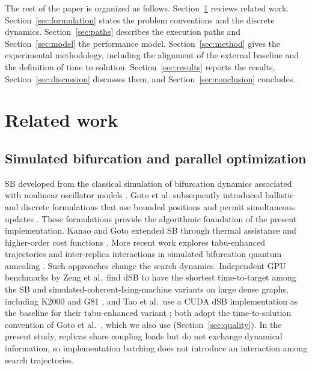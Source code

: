 \documentclass[11pt,a4paper]{article}
\begin{document}
The rest of the paper is organized as follows. Section~\ref{sec:related} reviews related work. Section~\ref{sec:formulation} states the problem conventions and the discrete dynamics. Section~\ref{sec:paths} describes the execution paths and Section~\ref{sec:model} the performance model. Section~\ref{sec:method} gives the experimental methodology, including the alignment of the external baseline and the definition of time to solution. Section~\ref{sec:results} reports the results, Section~\ref{sec:discussion} discusses them, and Section~\ref{sec:conclusion} concludes.

\section{Related work}\label{sec:related}
\subsection{Simulated bifurcation and parallel optimization}
SB developed from the classical simulation of bifurcation dynamics associated with nonlinear oscillator models \cite{goto2016,goto2019}. Goto et al. subsequently introduced ballistic and discrete formulations that use bounded positions and permit simultaneous updates \cite{goto2021}. These formulations provide the algorithmic foundation of the present implementation. Kanao and Goto extended SB through thermal assistance \cite{kanao2022} and higher-order cost functions \cite{kanao2023}. More recent work explores tabu-enhanced trajectories \cite{tabu2026} and inter-replica interactions in simulated bifurcation quantum annealing \cite{sbqa2026}. Such approaches change the search dynamics. Independent GPU benchmarks by Zeng et al.\ find dSB to have the shortest time-to-target among the SB and simulated-coherent-Ising-machine variants on large dense graphs, including K2000 and G81 \cite{zeng2024}, and Tao et al.\ use a CUDA dSB implementation as the baseline for their tabu-enhanced variant \cite{tabu2026}; both adopt the time-to-solution convention of Goto et al.~\cite{goto2021}, which we also use (Section~\ref{sec:quality}). In the present study, replicas share coupling loads but do not exchange dynamical information, so implementation batching does not introduce an interaction among search trajectories.
\end{document}
